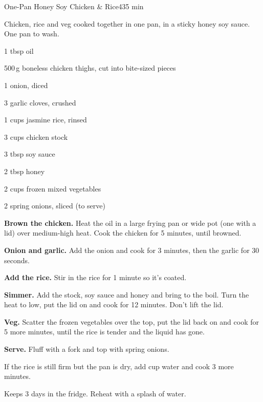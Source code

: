 \begin{recipebox}{One-Pan Honey Soy Chicken \& Rice}{4}{35 min}

Chicken, rice and veg cooked together in one pan, in a sticky honey soy sauce.
One pan to wash.

\begin{ingredients}
  \item 1 tbsp oil
  \item 500\,g boneless chicken thighs, cut into bite-sized pieces
  \item 1 onion, diced
  \item 3 garlic cloves, crushed
  \item 1 cups jasmine rice, rinsed
  \item 3 cups chicken stock
  \item 3 tbsp soy sauce
  \item 2 tbsp honey
  \item 2 cups frozen mixed vegetables
  \item 2 spring onions, sliced (to serve)
\end{ingredients}

\begin{method}
  \item \textbf{Brown the chicken.} Heat the oil in a large frying pan or wide pot
        (one with a lid) over medium-high heat. Cook the chicken for 5 minutes,
        until browned.
  \item \textbf{Onion and garlic.} Add the onion and cook for 3 minutes, then the
        garlic for 30 seconds.
  \item \textbf{Add the rice.} Stir in the rice for 1 minute so it's coated.
  \item \textbf{Simmer.} Add the stock, soy sauce and honey and bring to the boil.
        Turn the heat to low, put the lid on and cook for 12 minutes. Don't lift
        the lid.
  \item \textbf{Veg.} Scatter the frozen vegetables over the top, put the lid back
        on and cook for 5 more minutes, until the rice is tender and the liquid
        has gone.
  \item \textbf{Serve.} Fluff with a fork and top with spring onions.
\end{method}

\begin{notelist}
  \item If the rice is still firm but the pan is dry, add  cup
        water and cook 3 more minutes.
  \item Keeps 3 days in the fridge. Reheat with a splash of water.
\end{notelist}

\end{recipebox}
